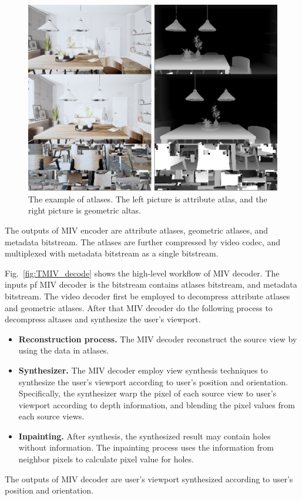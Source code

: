 \begin{figure}
    \centering
    \includegraphics[width=.38\textwidth]{figs/atlas_example.png}
    \caption{The example of atlases. The left picture is attribute atlas, and the right picture is geometric altas.}
    \label{fig:atlas_example}
\end{figure}

The outputs of MIV encoder are attribute atlases, geometric atlases, and metadata bitstream. The atlases are further compressed by video codec, and multiplexed with metadata bitstream as a single bitstream.

Fig.~\ref{fig:TMIV_decode} shows the high-level workflow of MIV decoder. The inputs pf MIV decoder is the bitstream contains atlases bitstream, and metadata bitstream. The video decoder first be employed to decompress attribute atlases and geometric atlases. After that MIV decoder do the following process to decompress altases and synthesize the user's viewport.
\begin{itemize}
    \item {\bf Reconstruction process.} The MIV decoder reconstruct the source view by using the data in atlases.
    \item {\bf Synthesizer.} The MIV decoder employ view synthesis techniques to synthesize the user's viewport according to user's position and orientation. Specifically, the synthesizer warp the pixel of each source view to user's viewport according to depth information, and blending the pixel values from each source views.
    \item {\bf Inpainting.}  After synthesis, the synthesized result may contain holes without information. The inpainting process uses the information from neighbor pixels to calculate pixel value for holes.
\end{itemize}
The outputs of MIV decoder are user's viewport synthesized according to user's position and orientation.
